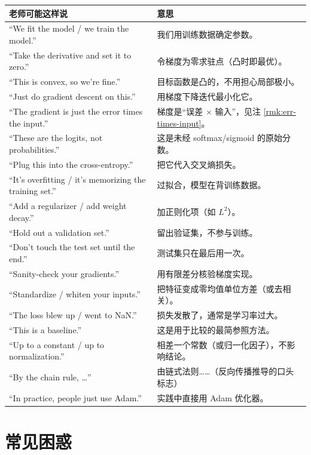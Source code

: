 \documentclass[UTF8,a4paper,11pt]{ctexart}
\theoremstyle{definition}
\theoremstyle{plain}
\theoremstyle{remark}
\begin{document}
\begin{center}
\begin{tabular}{@{}p{}p{}@{}}
\toprule
老师可能这样说 & 意思\\
\midrule
“We fit the model / we train the model.” & 我们用训练数据确定参数。\\
“Take the derivative and set it to zero.” & 令梯度为零求驻点（凸时即最优）。\\
“This is convex, so we're fine.” & 目标函数是凸的，不用担心局部极小。\\
“Just do gradient descent on this.” & 用梯度下降迭代最小化它。\\
“The gradient is just the error times the input.” & 梯度是“误差 $\times$ 输入”，见注 \ref{rmk:err-times-input}。\\
“These are the logits, not probabilities.” & 这是未经 softmax/sigmoid 的原始分数。\\
“Plug this into the cross-entropy.” & 把它代入交叉熵损失。\\
“It's overfitting / it's memorizing the training set.” & 过拟合，模型在背训练数据。\\
“Add a regularizer / add weight decay.” & 加正则化项（如 $L^2$）。\\
“Hold out a validation set.” & 留出验证集，不参与训练。\\
“Don't touch the test set until the end.” & 测试集只在最后用一次。\\
“Sanity-check your gradients.” & 用有限差分核验梯度实现。\\
“Standardize / whiten your inputs.” & 把特征变成零均值单位方差（或去相关）。\\
“The loss blew up / went to NaN.” & 损失发散了，通常是学习率过大。\\
“This is a baseline.” & 这是用于比较的最简参照方法。\\
“Up to a constant / up to normalization.” & 相差一个常数（或归一化因子），不影响结论。\\
“By the chain rule, \dots” & 由链式法则……（反向传播推导的口头标志）\\
“In practice, people just use Adam.” & 实践中直接用 Adam 优化器。\\
\bottomrule
\end{tabular}
\end{center}

\section{常见困惑}\label{sec:confusion}
\end{document}
